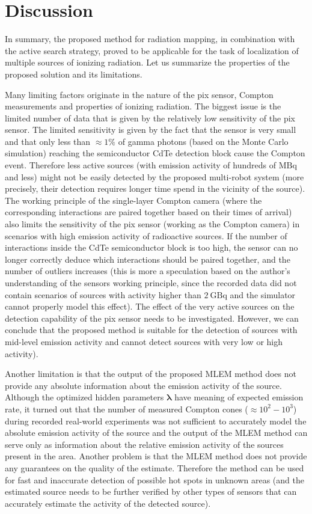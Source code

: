 \section{Discussion}
In summary, the proposed method for radiation mapping, in combination with the active search strategy, proved to be applicable for the task of localization of multiple sources of ionizing radiation.
Let us summarize the properties of the proposed solution and its limitations.

Many limiting factors originate in the nature of the \ac{pix} sensor, Compton measurements and properties of ionizing radiation.
The biggest issue is the limited number of data that is given by the relatively low sensitivity of the \ac{pix} sensor.
The limited sensitivity is given by the fact that the sensor is very small and that only less than $\approx 1\%$ of gamma photons (based on the Monte Carlo simulation) reaching the semiconductor \ac{CdTe} detection block cause the Compton event.
Therefore less active sources (with emission activity of hundreds of $\si{\mega\becquerel}$ and less) might not be easily detected by the proposed multi-robot system (more precisely, their detection requires longer time spend in the vicinity of the source).
The working principle of the single-layer Compton camera (where the corresponding interactions are paired together based on their times of arrival) 
also limits the sensitivity of the \ac{pix} sensor (working as the Compton camera) in scenarios with high emission activity of radioactive sources.
If the number of interactions inside the \ac{CdTe} semiconductor block is too high, the sensor can no longer correctly deduce which interactions should be paired together, and the number of outliers increases (this is more a speculation based on the author's understanding of the sensors working principle, since the recorded data did not contain scenarios of sources with activity higher than $\SI{2}{\giga\becquerel}$ and the simulator cannot properly model this effect).
The effect of the very active sources on the detection capability of the \ac{pix} sensor needs to be investigated.
However, we can conclude that the proposed method is suitable for the detection of sources with mid-level emission activity and cannot detect sources with very low or high activity).

Another limitation is that the output of the proposed \ac{MLEM} method does not provide any absolute information about the emission activity of the source.
Although the optimized hidden parameters $\bm{\lambda}$ have meaning of expected emission rate, 
it turned out that the number of measured Compton cones ($\approx 10^{2}-10^{3}$) during recorded real-world experiments was not sufficient to accurately model the absolute emission activity of the source
and the output of the \ac{MLEM} method can serve only as information about the relative emission activity of the sources present in the area.
Another problem is that the \ac{MLEM} method does not provide any guarantees on the quality of the estimate.
Therefore the method can be used for fast and inaccurate detection of possible hot spots in unknown areas (and the estimated source needs to be further verified by other types of sensors that can accurately estimate the activity of the detected source).

